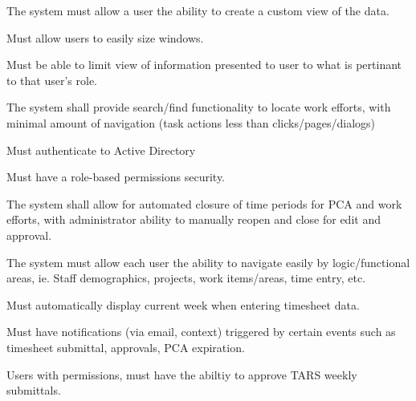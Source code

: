 The system must allow a user the ability to create a custom view of the data.

Must allow users to easily size windows.

Must be able to limit view of information presented to user to what is pertinant to that user's role.

The system shall provide search/find functionality to locate work efforts, with minimal amount of navigation (task actions less than clicks/pages/dialogs)

Must authenticate to Active Directory

Must have a role-based permissions security.

The system shall allow for automated closure of time periods for PCA and work efforts, with administrator ability to manually reopen and close for edit and approval.

The system must allow each user the ability to navigate easily by logic/functional areas, ie. Staff demographics, projects, work items/areas, time entry, etc.

Must automatically display current week when entering timesheet data.

Must have notifications (via email, context) triggered by certain events such as timesheet submittal, approvals, PCA expiration. 

Users with permissions, must have the abiltiy to approve TARS weekly submittals.
